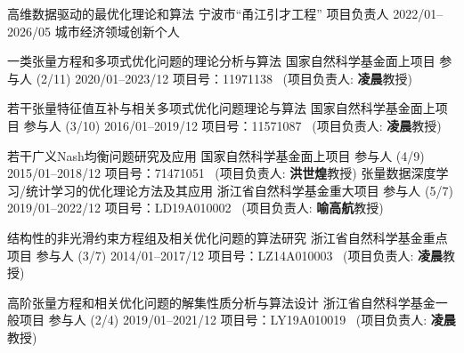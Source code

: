 \begin{cventries}
 \cventry
 {高维数据驱动的最优化理论和算法} %
 {宁波市“甬江引才工程”} %
 {项目负责人} %
 {2022/01--2026/05} %
 {城市经济领域创新个人}

\cventry
{一类张量方程和多项式优化问题的理论分析与算法} %
{国家自然科学基金面上项目} %
{参与人 (2/11)} %
{2020/01--2023/12} %
{项目号：11971138 ~(项目负责人: {\bf 凌晨}教授) }

\cventry
{若干张量特征值互补与相关多项式优化问题理论与算法 } %
{国家自然科学基金面上项目} %
{参与人 (3/10)} %
{2016/01--2019/12 } %
{项目号：11571087 ~(项目负责人: {\bf 凌晨}教授) }
 
 \cventry
 { 若干广义Nash均衡问题研究及应用} %
 {国家自然科学基金面上项目} %
 {参与人 (4/9)} %
 {2015/01--2018/12 } %
 {项目号：71471051 ~(项目负责人: {\bf 洪世煌}教授) }
\cventry
{张量数据深度学习/统计学习的优化理论方法及其应用} %
{浙江省自然科学基金重大项目} %
{参与人 (5/7)} %
{2019/01--2022/12 } %
{项目号：LD19A010002 ~(项目负责人: {\bf 喻高航}教授) }

\cventry
{ 结构性的非光滑约束方程组及相关优化问题的算法研究} %
{浙江省自然科学基金重点项目} %
{参与人 (3/7)} %
{2014/01--2017/12} %
{项目号：LZ14A010003 ~(项目负责人: {\bf 凌晨}教授) }

\cventry
{ 高阶张量方程和相关优化问题的解集性质分析与算法设计} %
{浙江省自然科学基金一般项目} %
{参与人 (2/4)} %
{2019/01--2021/12} %
{项目号：LY19A010019 ~(项目负责人: {\bf 凌晨}教授) }

\end{cventries}
